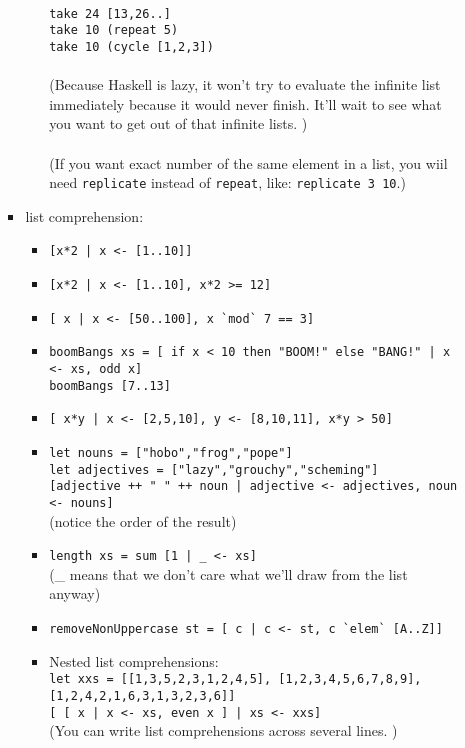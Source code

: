 \documentclass[a4paper,10pt]{article}
\begin{document}
\begin{enumerate}
\begin{enumerate}
\begin{itemize}
\begin{itemize}
   \\\texttt{take 24 [13,26..]}
   \\\texttt{take 10 (repeat 5)}
   \\\texttt{take 10 (cycle [1,2,3])}
   \\\\(Because Haskell is lazy, it won't try to evaluate the infinite list immediately because it would never finish. It'll wait to see what you want to get out of that infinite lists. )
   \\\\(If you want exact number of the same element in a list, you wiil need \texttt{replicate} instead of \texttt{repeat}, like: \texttt{replicate 3 10}.)\\
  \end{itemize}
  \item list comprehension:
  \begin{itemize}
   \item \texttt{[x*2 | x <- [1..10]]}
   \item \texttt{[x*2 | x <- [1..10], x*2 >= 12]}
   \item \texttt{[ x | x <- [50..100], x \`{}mod\`{} 7 == 3]}
   \item \texttt{boomBangs xs = [ if x < 10 then "BOOM!" else "BANG!" | x <- xs, odd x]}
   \\\texttt{boomBangs [7..13]}
   \item \texttt{[ x*y | x <- [2,5,10], y <- [8,10,11], x*y > 50]}
   \item \texttt{let nouns = ["hobo","frog","pope"]}
   \\\texttt{let adjectives = ["lazy","grouchy","scheming"]}
   \\\texttt{[adjective ++ " " ++ noun | adjective <- adjectives, noun <- nouns]}
   \\(notice the order of the result)
   \item \texttt{length\textquotesingle \ xs = sum [1 | \_ <- xs]}
   \\(\_ means that we don't care what we'll draw from the list anyway)
   \item \texttt{removeNonUppercase st = [ c | c <- st, c \`{}elem\`{} [\textquotesingle A\textquotesingle..\textquotesingle Z\textquotesingle]]}
   \item Nested list comprehensions:
   \\\texttt{let xxs = [[1,3,5,2,3,1,2,4,5], [1,2,3,4,5,6,7,8,9], [1,2,4,2,1,6,3,1,3,2,3,6]]}
   \\\texttt{[ [ x | x <- xs, even x ] | xs <- xxs]}
   \\(You can write list comprehensions across several lines. )
  \end{itemize}
  \end{itemize}
  \end{enumerate}
\end{enumerate}
\end{document}
